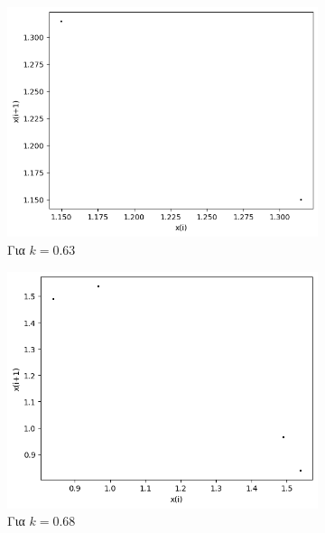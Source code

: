 \begin{figure}[ht]
\begin{subfigure}[b]{0.4\textwidth}
		\includegraphics[width=\textwidth]{LateX images/graphs q12/g5}
		\caption{Για $k=0.63$}
		\label{f:k61}
	\end{subfigure}
	\hfill
	\begin{subfigure}[b]{0.4\textwidth}
		\centering
		\includegraphics[width=\textwidth]{LateX images/graphs q12/g6}
		\caption{Για $k=0.68$}
		\label{f:k62}
	\end{subfigure}
	\hfill
	\begin{subfigure}[b]{0.4\textwidth}
		\centering

\end{subfigure}
\end{figure}
